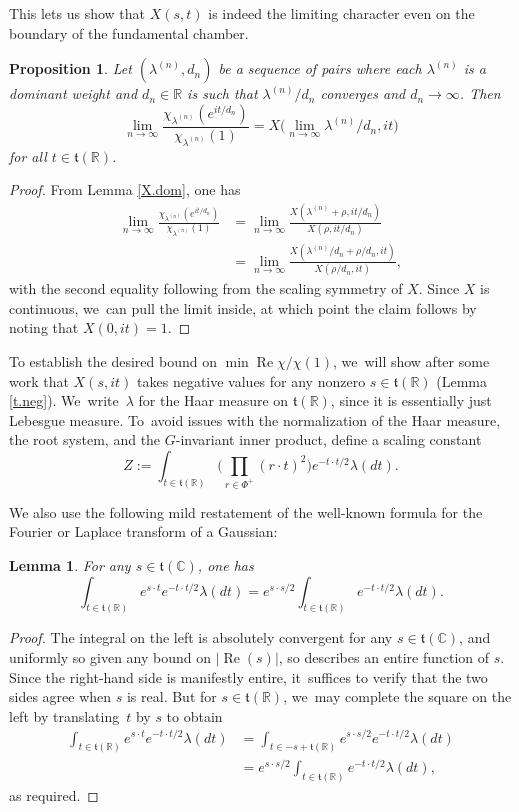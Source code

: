 \documentclass[10pt]{amsart}
\newtheorem{lem}[equation]{Lemma}
\newtheorem{prop}[equation]{Proposition}
\theoremstyle{definition}
\newcommand{\mft}{\mathfrak{t}}
\newcommand{\R}{\mathbb{R}}
\newcommand{\C}{\mathbb{C}}
\DeclareMathOperator{\RE}{Re}
\numberwithin{equation}{section}
\begin{document}
This lets us show that $X(s,t)$ is indeed the limiting character even on
the boundary of the fundamental chamber.

\begin{prop} \label{167}
Let $(\lambda^{(n)},d_n)$ be a sequence of pairs where each $\lambda^{(n)}$ is a dominant weight and $d_n \in \R$ is such that
$\lambda^{(n)}/d_n$ converges and $d_n \to \infty$. Then
\[
\lim_{n\to\infty}
\frac{\chi_{\lambda^{(n)}}(e^{it/d_n})}{\chi_{\lambda^{(n)}}(1)}
=
X\bigl(\lim_{n\to\infty} \lambda^{(n)}/d_n,it \bigr)
\]
for all $t\in \mft(\R)$.
\end{prop}

\begin{proof}
From Lemma \ref{X.dom}, one has
\begin{align*}
\lim_{n\to\infty}
\frac{\chi_{\lambda^{(n)}}(e^{it/d_n})}{\chi_{\lambda^{(n)}}(1)}
& =
\lim_{n\to\infty}
\frac{X(\lambda^{(n)}+\rho,it/d_n)}{X(\rho,it/d_n)} \\
&=
\lim_{n\to\infty}
\frac{X(\lambda^{(n)}/d_n+\rho/d_n,it)}{X(\rho/d_n,it)},
\end{align*}
with the second equality following from the scaling symmetry of $X$.
Since $X$ is continuous, we~can pull the limit inside, at which point
the claim follows by noting that $X(0,it)=1$.
\end{proof}

To establish the desired bound on $\min\RE\chi/\chi(1)$, we~will
show after some work that $X(s,it)$ takes negative values for any nonzero $s\in \mft(\R)$ (Lemma \ref{t.neg}). We~write~$\lambda$ for the Haar measure on $\mft(\R)$, since it is essentially just Lebesgue measure.
To~avoid issues with the normalization of the Haar measure, the root
system, and the $G$\nobreakdash-invariant inner product, define a scaling constant
\[
Z := \int_{t\in \mft(\R)} \biggl( \prod_{r\in \Phi^+}(r\cdot t)^2 \biggr) e^{-t\cdot
t/2}
\lambda(dt).
\]

We also use the following mild restatement of the well-known formula for the Fourier or Laplace transform of a Gaussian:
\begin{lem} \label{fourier}
For any $s\in \mft(\C)$, one has
\[
\int_{t \in \mft(\R)} e^{s\cdot t} e^{-t\cdot t/2} \lambda(dt)
=
e^{s\cdot s/2} \int_{t \in \mft(\R)} e^{-t\cdot t/2} \lambda(dt).
\]
\end{lem}

\begin{proof}
The integral on the left is absolutely convergent for any $s\in \mft(\C)$, and uniformly so given any bound on $\left|\RE(s)\right|$, so describes an entire function of $s$. Since the right-hand side is manifestly entire, it~suffices to verify that the two sides agree when $s$ is real. But for $s\in \mft(\R)$, we~may complete the square on the left by translating~$t$ by $s$ to obtain
\begin{align*}
\int_{t\in \mft(\R)} e^{s\cdot t} e^{-t\cdot t/2} \lambda(dt)
&=
\int_{t\in -s+\mft(\R)} e^{s\cdot s/2} e^{-t\cdot t/2} \lambda(dt)\\
&=
e^{s\cdot s/2} \int_{t\in \mft(\R)} e^{-t\cdot t/2} \lambda(dt),
\end{align*}
as required.
\end{proof}
\end{document}
